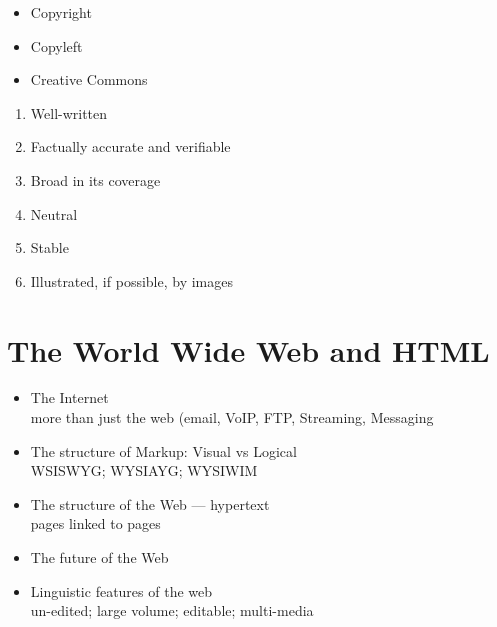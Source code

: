\documentclass[a4paper,landscape,headrule,footrule,xetex]{foils}
\begin{document}

\begin{itemize}
\item Copyright
\item Copyleft
\item Creative Commons
\end{itemize}


\begin{enumerate}
\item Well-written
\item Factually accurate and verifiable
\item Broad in its coverage
\item Neutral
\item Stable
\item Illustrated, if possible, by images
\end{enumerate}


\section{The World Wide Web and HTML}


\begin{itemize}
\item The Internet
   \\ more than just the web (email, VoIP, FTP, Streaming, Messaging~
\item The structure of Markup: Visual vs Logical
  \\ WSISWYG; WYSIAYG; WYSIWIM
\item The structure of the Web --- hypertext
\\ pages linked to pages
\item The future of the Web
\item Linguistic features of the web
 \\ un-edited; large volume; editable; multi-media
\end{itemize}

\end{document}
